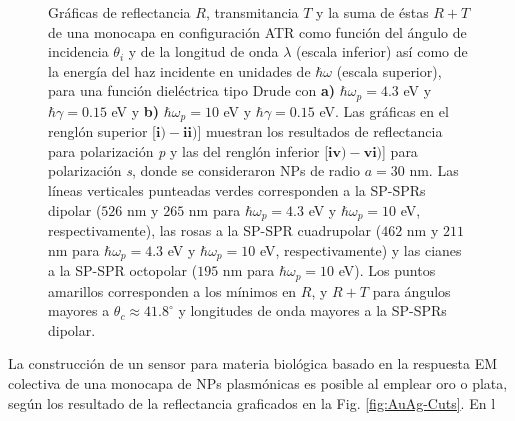 \begin{figure}[h!]
	\caption{Gráficas de reflectancia $R$, transmitancia $T$ y la suma de éstas $R+T$ de una monocapa en configuración ATR como función del ángulo de incidencia $\theta_i$ y de la longitud de onda $\lambda$ (escala inferior) así como de la energía del haz incidente en unidades de $\hbar\omega$ (escala superior), para una función dieléctrica tipo Drude con \textbf{a)} $\hbar\omega_p=4. 3$ eV  y  $\hbar\gamma=0. 15$ eV y \textbf{b)} $\hbar\omega_p = 10$ eV y $\hbar\gamma = 0.15$ eV.  Las gráficas   en el renglón superior [$\mathbf{i)-ii)}$]  muestran los resultados de reflectancia para  polarización \emph{p} y las del renglón inferior  [$\mathbf{iv)-vi)}$] para polarización  \emph{s}, donde se consideraron NPs de radio $a=30$ nm. Las líneas verticales punteadas verdes corresponden a la SP-SPRs dipolar ($526$ nm y $265$ nm para $\hbar\omega_p=4.3$ eV y $\hbar\omega_p = 10$ eV, respectivamente), las rosas a la SP-SPR cuadrupolar ($462$ nm y $211$ nm para $\hbar\omega_p=4.3$ eV y $\hbar\omega_p = 10$ eV, respectivamente) y las cianes a la SP-SPR octopolar ($195$ nm para $\hbar\omega_p = 10$ eV). Los puntos amarillos corresponden a los mínimos en $R$, y $R+T$ para ángulos mayores a $\theta_c\approx 41.8^\circ$ y longitudes de onda mayores a la SP-SPRs dipolar. }\label{fig:RT-Omegas}
	\end{figure}	





La construcción de un sensor para materia biológica basado en la respuesta EM colectiva de una monocapa de NPs plasmónicas es posible al emplear oro o plata, según los resultado de la reflectancia graficados en la Fig. \ref{fig:AuAg-Cuts}.  En l





